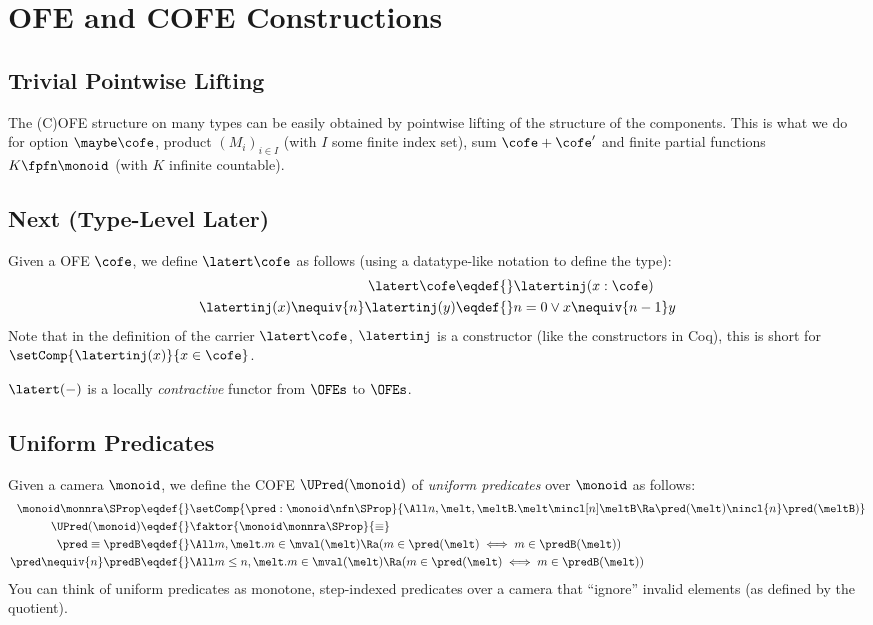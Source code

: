 \section{OFE and COFE Constructions}

\subsection{Trivial Pointwise Lifting}

The (C)OFE structure on many types can be easily obtained by pointwise lifting of the structure of the components.
This is what we do for option $\maybe\cofe$, product $(M_i)_{i \in I}$ (with $I$ some finite index set), sum $\cofe + \cofe'$ and finite partial functions $K \fpfn \monoid$ (with $K$ infinite countable).

\subsection{Next (Type-Level Later)}

Given a OFE $\cofe$, we define $\latert\cofe$ as follows (using a datatype-like notation to define the type):
\begin{align*}
  \latert\cofe \eqdef{}& \latertinj(x:\cofe) \\
  \latertinj(x) \nequiv{n} \latertinj(y) \eqdef{}& n = 0 \lor x \nequiv{n-1} y
\end{align*}
Note that in the definition of the carrier $\latert\cofe$, $\latertinj$ is a constructor (like the constructors in Coq), \ie this is short for $\setComp{\latertinj(x)}{x \in \cofe}$.

$\latert(-)$ is a locally \emph{contractive} functor from $\OFEs$ to $\OFEs$.


\subsection{Uniform Predicates}

Given a camera $\monoid$, we define the COFE $\UPred(\monoid)$ of \emph{uniform predicates} over $\monoid$ as follows:
\begin{align*}
\monoid \monnra \SProp \eqdef{}& \setComp{\pred: \monoid \nfn \SProp}
{\All n, \melt, \meltB. \melt \mincl[n] \meltB \Ra \pred(\melt) \nincl{n} \pred(\meltB)} \\
  \UPred(\monoid) \eqdef{}&  \faktor{\monoid \monnra \SProp}{\equiv} \\
  \pred \equiv \predB \eqdef{}& \All m, \melt. m \in \mval(\melt) \Ra (m \in \pred(\melt) \iff  m \in \predB(\melt)) \\
  \pred \nequiv{n} \predB \eqdef{}& \All m \le n, \melt. m \in \mval(\melt) \Ra (m \in \pred(\melt) \iff  m \in \predB(\melt))
\end{align*}
You can think of uniform predicates as monotone, step-indexed predicates over a camera that ``ignore'' invalid elements (as defined by the quotient).


